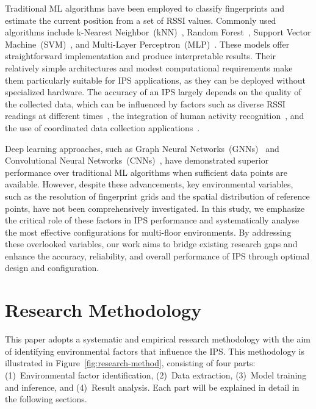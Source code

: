 \documentclass[runningheads]{llncs}
\begin{document}
Traditional ML algorithms have been employed to classify fingerprints and estimate the current position from a set of RSSI values. Commonly used algorithms include k-Nearest Neighbor~(kNN)~\cite{LRE1,LRE2,LRE6}, Random Forest~\cite{LRE1,LRE5,LRE6}, Support Vector Machine~(SVM)~\cite{add1,LRE1,LRE2,LRE6}, and Multi-Layer Perceptron~(MLP)~\cite{LRE1,LRE2}. These models offer straightforward implementation and produce interpretable results. Their relatively simple architectures and modest computational requirements make them particularly suitable for IPS applications, as they can be deployed without specialized hardware. The accuracy of an IPS largely depends on the quality of the collected data, which can be influenced by factors such as diverse RSSI readings at different times~\cite{LRE3}, the integration of human activity recognition~\cite{LRE4}, and the use of coordinated data collection applications~\cite{LRE7}.

Deep learning approaches, such as Graph Neural Networks~(GNNs)~\cite{LRE2} and Convolutional Neural Networks~(CNNs)~\cite{LRE4}, have demonstrated superior performance over traditional ML algorithms when sufficient data points are available. However, despite these advancements, key environmental variables, such as the resolution of fingerprint grids and the spatial distribution of reference points, have not been comprehensively investigated. In this study, we emphasize the critical role of these factors in IPS performance and systematically analyse the most effective configurations for multi-floor environments. By addressing these overlooked variables, our work aims to bridge existing research gaps and enhance the accuracy, reliability, and overall performance of IPS through optimal design and configuration.


\section{Research Methodology}\label{sec:research-method}

This paper adopts a systematic and empirical research methodology with the aim of identifying environmental factors that influence the IPS. This methodology is illustrated in Figure~\ref{fig:research-method}, consisting of four parts: (1)~Environmental factor identification, (2)~Data extraction, (3)~Model training and inference, and (4)~Result analysis. Each part will be explained in detail in the following sections.
\end{document}
